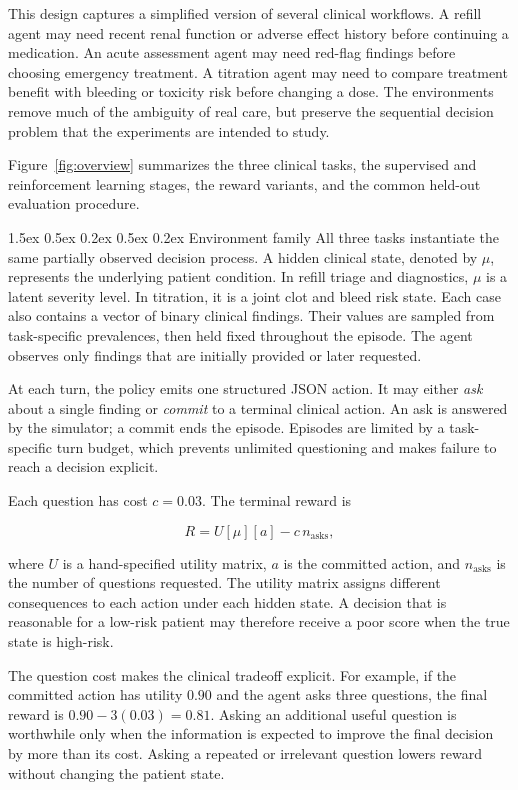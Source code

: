 \documentclass{article}
\makeatletter
\renewcommand{\paragraph}{%
  \@startsection{paragraph}{4}{\z@}%
                {1.5ex \@plus 0.5ex \@minus 0.2ex}%
                {0.5ex \@plus 0.2ex}%
                {\normalsize\bf}}
\makeatother
\begin{document}
This design captures a simplified version of several clinical workflows. A refill
agent may need recent renal function or adverse effect history before continuing a
medication. An acute assessment agent may need red-flag findings before choosing
emergency treatment. A titration agent may need to compare treatment benefit with
bleeding or toxicity risk before changing a dose. The environments remove much of
the ambiguity of real care, but preserve the sequential decision problem that the
experiments are intended to study.

Figure~\ref{fig:overview} summarizes the three clinical tasks, the supervised and
reinforcement learning stages, the reward variants, and the common held-out
evaluation procedure.

\paragraph{Environment family}
All three tasks instantiate the same partially observed decision process. A hidden
clinical state, denoted by $\mu$, represents the underlying patient condition. In
refill triage and diagnostics, $\mu$ is a latent severity level. In titration, it
is a joint clot and bleed risk state. Each case also contains a vector of binary
clinical findings. Their values are sampled from task-specific prevalences, then
held fixed throughout the episode. The agent observes only findings that are
initially provided or later requested.

At each turn, the policy emits one structured JSON action. It may either
\emph{ask} about a single finding or \emph{commit} to a terminal clinical action.
An ask is answered by the simulator; a commit ends the episode. Episodes are
limited by a task-specific turn budget, which prevents unlimited questioning and
makes failure to reach a decision explicit.

Each question has cost $c{=}0.03$. The terminal reward is

\[
R = U[\mu][a] - c\,n_{\text{asks}},
\]

where $U$ is a hand-specified utility matrix, $a$ is the committed action, and
$n_{\text{asks}}$ is the number of questions requested. The utility matrix assigns
different consequences to each action under each hidden state. A decision that is
reasonable for a low-risk patient may therefore receive a poor score when the true
state is high-risk.

The question cost makes the clinical tradeoff explicit. For example, if the
committed action has utility $0.90$ and the agent asks three questions, the final
reward is $0.90 - 3(0.03) = 0.81$. Asking an additional useful question is
worthwhile only when the information is expected to improve the final decision by
more than its cost. Asking a repeated or irrelevant question lowers reward without
changing the patient state.
\end{document}
